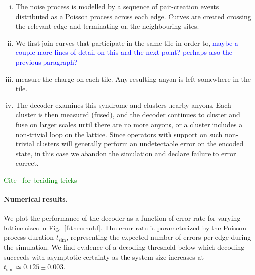 \documentclass[aps, prl, letterpaper, twocolumn, superscriptaddress, notitlepage, 10pt]{revtex4-1}
\newcommand{\Fref}[1]{Fig.~\ref{#1}}
\newcommand{\cggb}[1]{\textcolor{blue}{#1}}
\newcommand{\stf}[1]{\textcolor{green}{#1}}
\begin{document}
\begin{enumerate}[i)]
\item The noise process is modelled by a sequence of pair-creation events distributed as 
a Poisson process across each edge. Curves are created crossing the relevant edge 
and terminating on the neighbouring sites.
\item We first join curves that participate in the same tile in order to, 
\cggb{maybe a couple more lines of detail on this and the next point? perhaps also the previous paragraph?}
\item measure the charge on each tile. Any resulting anyon is left somewhere in the tile.
\item The decoder examines this syndrome and clusters nearby anyons. Each cluster 
is then measured (fused), and the decoder continues to cluster and fuse on larger 
scales until there are no more anyons, or a cluster includes a non-trivial loop on the 
lattice. Since operators with support on such non-trivial clusters will generally perform an 
undetectable error on the encoded state, in this case we abandon the simulation and 
declare failure to error correct.
\end{enumerate}

\stf{Cite~\cite{Pfeifer2010} for braiding tricks}

\paragraph{Numerical results.}

We plot the performance of the decoder as a function of error rate for varying lattice sizes in 
\Fref{f:threshold}. The error rate is parameterized by the Poisson process duration 
$t_{\mathrm{sim}}$, representing the expected number of errors per edge during the simulation. 
We find evidence of a decoding threshold below which decoding succeeds with asymptotic 
certainty as the system size increases at $t_{\mathrm{sim}}\simeq 0.125 \pm 0.003$.
\end{document}

